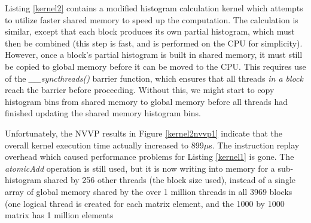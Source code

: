 \documentclass{article}
\begin{document}
Listing \ref{kernel2} contains a modified histogram calculation kernel which attempts to utilize faster shared memory to speed up the computation. The calculation is similar, except that each block produces its own partial histogram, which must then be combined (this step is fast, and is performed on the CPU for simplicity). However, once a block's partial histogram is built in shared memory, it must still be copied to global memory before it can be moved to the CPU. This requires use of the \emph{\_\_syncthreads()} barrier function, which ensures that all threads \emph{in a block} reach the barrier before proceeding. Without this, we might start to copy histogram bins from shared memory to global memory before all threads had finished updating the shared memory histogram bins.

Unfortunately, the NVVP results in Figure \ref{kernel2nvvp1} indicate that the overall kernel execution time actually increased to 899$\mu$s. The instruction replay overhead which caused performance problems for Listing \ref{kernel1} is gone. The \emph{atomicAdd} operation is still used, but it is now writing into memory for a sub-histogram shared by 256 other threads (the block size used), instead of a single array of global memory shared by the over 1 million threads in all 3969 blocks (one logical thread is created for each matrix element, and the 1000 by 1000 matrix has 1 million elements
\end{document}
